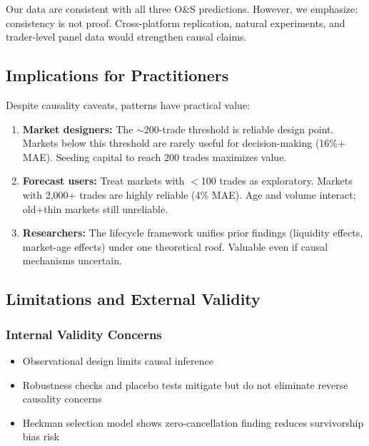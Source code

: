 \documentclass[a4paper,11pt]{article}
\theoremstyle{plain}
\theoremstyle{definition}
\theoremstyle{remark}
\begin{document}
Our data are consistent with all three O\&S predictions. However, we emphasize: consistency is not proof. Cross-platform replication, natural experiments, and trader-level panel data would strengthen causal claims.

\subsection{Implications for Practitioners}
\label{subsec:implications}

Despite causality caveats, patterns have practical value:

\begin{enumerate}
    \item \textbf{Market designers:} The $\sim$200-trade threshold is reliable design point. Markets below this threshold are rarely useful for decision-making (16\%+ MAE). Seeding capital to reach 200 trades maximizes value.
    
    \item \textbf{Forecast users:} Treat markets with $<$100 trades as exploratory. Markets with 2,000+ trades are highly reliable (4\% MAE). Age and volume interact; old+thin markets still unreliable.
    
    \item \textbf{Researchers:} The lifecycle framework unifies prior findings (liquidity effects, market-age effects) under one theoretical roof. Valuable even if causal mechanisms uncertain.
\end{enumerate}

\subsection{Limitations and External Validity}
\label{subsec:limitations}

\subsubsection{Internal Validity Concerns}

\begin{itemize}
    \item Observational design limits causal inference
    \item Robustness checks and placebo tests mitigate but do not eliminate reverse causality concerns
    \item Heckman selection model shows zero-cancellation finding reduces survivorship bias risk
\end{itemize}
\end{document}
